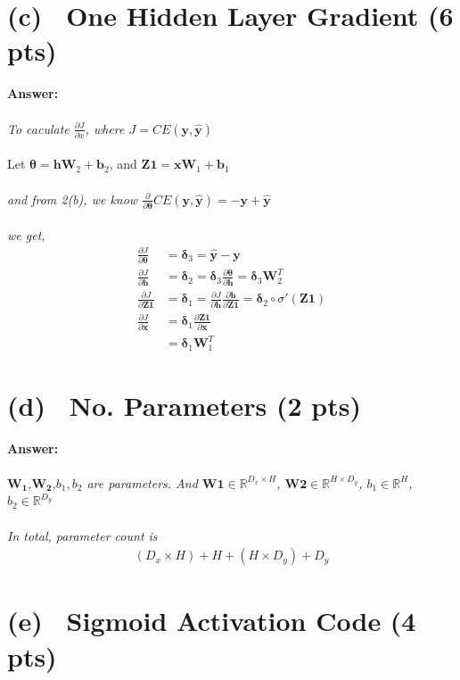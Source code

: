 \documentclass[fleqn]{MJD}
\newcommand{\subproblem}[2]{\section{(#1)~ #2}}
\newcommand{\0}{\emptyset}
\begin{document}
\newpage

\subproblem{c}{One Hidden Layer Gradient (6 pts)}

\noindent \textbf{Answer:} \\
\\
\noindent \textit{To caculate $\frac{\partial J}{\partial x}$, where $J= CE(\mathbf{y}, \hat{\mathbf{y}})$ } \\
\\
\noindent Let $\bm{\theta}=\bm{hW}_{2} + \bm{b}_{2}$, and $\bm{Z1}=\bm{xW}_{1} + \bm{b}_{1}$ \\
\\
\noindent \textit{and from 2(b), we know $\frac{\partial}{\partial \bm{\theta}}CE(\mathbf{y}, \hat{\mathbf{y}})= -  \bm{y} + \bm{\hat{y}}$} \\
\\
\noindent \textit{we get, }
\begin{align}
	\frac{\partial J}{\partial \bm{\theta}} %
		&= \bm{\delta}_{3} = \hat{\bm{y}} - \bm{y} \nonumber \\
	\frac{\partial J}{\partial \bm{h}} %
		&= \bm{\delta}_{2} = \bm{\delta}_{3} \frac{\partial \bm{\theta}}{\partial \bm{h}}= \bm{\delta}_{3}\bm{W}_{2}^{T} \nonumber \\
	\frac{\partial J}{\partial \bm{Z1}} %
			&= \bm{\delta}_{1} = \frac{\partial J}{\partial \bm{h}} \frac{\partial \bm{h}}{\partial \bm{Z1}} = \bm{\delta}_{2} \circ \sigma'(\bm{Z1}) \nonumber \\
	\frac{\partial J}{\partial \bm{x}} %
		&= \bm{\delta}_{1} \frac{\partial \bm{Z1}}{\partial \bm{x}} \nonumber \\
		&= \bm{\delta}_{1}  \bm{W}_{1}^{T} \nonumber
\end{align}

\subproblem{d}{No. Parameters (2 pts)}

\noindent \textbf{Answer:} \\
\\
\textit {$\bm{W_{1}}$,$\bm{W_{2}}$,$b_{1},b_{2}$ are parameters. And $\bm{W1} \in \mathbb{R}^{D_{x} \times H}$, $\bm{W2} \in \mathbb{R}^{H \times D_{y}}$, $b_{1} \in \mathbb{R}^{H}$, $b_{2} \in \mathbb{R}^{D_{y}}$} \\
\\
\textit {In total, parameter count is}
\begin{align}
	(D_{x} \times H) + H + (H \times D_{y}) + D_{y} \nonumber
\end{align}

\subproblem{e}{Sigmoid Activation Code (4 pts)}
\end{document}
